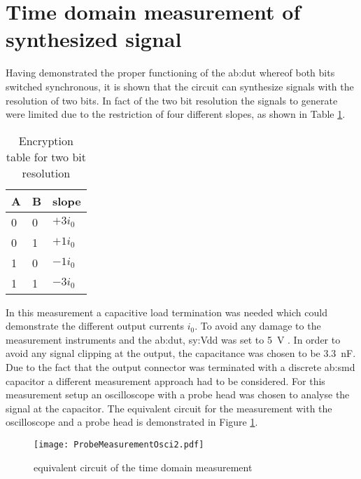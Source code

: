 \section{Time domain measurement of synthesized signal}
\label{ch:timedomainmeas}
Having demonstrated the proper functioning of the \gls{ab:dut} whereof both bits switched synchronous, it is shown that the circuit can synthesize signals with the resolution of two bits.
In fact of the two bit resolution the signals to generate were limited due to the restriction of four different slopes, as shown in Table \ref{tab:TwoBitRes}.

\begin{table}[]
\centering
\begin{tabular}{|l|l|l|}
\hline
\textbf{A} & \textbf{B} & \textbf{slope} \\ \hline
0          & 0          & $+3 i_0$          \\ \hline
0          & 1          & $+1 i_0$          \\ \hline
1          & 0          & $-1 i_0$          \\ \hline
1          & 1          & $-3 i_0$          \\ \hline
\end{tabular}
\caption{Encryption table for two bit resolution}
\label{tab:TwoBitRes}
\end{table}

In this measurement a capacitive load termination was needed which could demonstrate the different output currents $i_0$.
To avoid any damage to the measurement instruments and the \gls{ab:dut}, \gls{sy:Vdd} was set to \SI{5}{\volt} .
In order to avoid any signal clipping at the output, the capacitance was chosen to be \SI{3.3}{\nano \farad}.
Due to the fact that the output connector was terminated with a discrete \gls{ab:smd} capacitor a different measurement approach had to be considered.
For this measurement setup an oscilloscope with a probe head was chosen to analyse the signal at the capacitor.
The equivalent circuit for the measurement with the oscilloscope and a probe head is demonstrated in Figure \ref{fig:equivalentprobecircuit}.
\begin{figure}[htb!]
	\centering
  \texttt{[image: ProbeMeasurementOsci2.pdf]}
	\caption{equivalent circuit of the time domain measurement}
	\label{fig:equivalentprobecircuit}
\end{figure}

